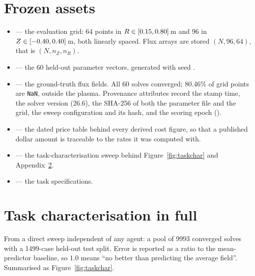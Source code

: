 \section{Frozen assets}
\label{app:assets}

\begin{itemize}
\item {} --- the evaluation grid: 64
  points in $R \in [0.15, 0.80]$\,m and 96 in
  $Z \in [-0.40, 0.40]$\,m, both linearly spaced. Flux arrays are stored
  $(N, 96, 64)$, that is $(N, n_Z, n_R)$.
\item {} --- the 60 held-out parameter
  vectors, generated with seed .
\item {} --- the ground-truth flux fields.
  All 60 solves converged; 80.46\% of grid points are \texttt{NaN}, outside the
  plasma. Provenance attributes record the stamp time, the solver version
  (26.6), the SHA-256 of both the parameter file and the grid, the sweep
  configuration and its hash, and the scoring epoch ().
\item {} --- the dated price table behind
  every derived cost figure, so that a published dollar amount is traceable to
  the rates it was computed with.
\item {} --- the task-characterisation
  sweep behind Figure~\ref{fig:taskchar} and Appendix~\ref{app:characterisation}.
\item {} --- the task specifications.
\end{itemize}

\section{Task characterisation in full}
\label{app:characterisation}

From a direct sweep independent of any agent: a pool of 9993 converged solves
with a 1499-case held-out test split. Error is reported as a ratio to the
mean-predictor baseline, so $1.0$ means ``no better than predicting the average
field''. Summarised as Figure~\ref{fig:taskchar}.

